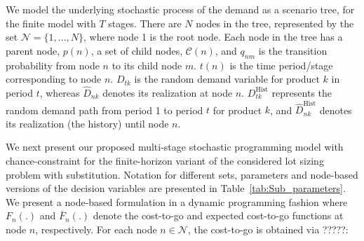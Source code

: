 \documentclass[10pt]{article}
\newcommand{\ti}{t} %
\newcommand{\Ti}{T}
\newcommand{\ka}{k} %
\newcommand{\InvPos}{inventory level after production }
\newcommand{\cn}{\mathcal{C}(n) }
\begin{document}
We model the underlying stochastic process of the demand as a scenario tree, for the finite model with $\Ti$ stages. There are $N$ nodes in the tree, represented by the set $\mathcal{N} = \{1, ..., N\}$, where node 1 is the root node. 
 Each node in the tree has a parent node, $p(n)$, a set of child nodes, $\cn$, and $q_{nm}$ is the transition probability from node $n$ to its child node $m$. $\ti(n)$ is the time period/stage corresponding to node $n$. 
$D_{\ti \ka}$ is the random demand variable for product $\ka$ in period $\ti$, whereas $\hat{D}_{n \ka}$ denotes its realization at node $n$.
$D^\text{Hist}_{\ti \ka}$ represents the random demand path from period 1 to period $\ti$ for product $\ka$, and $\hat{D}^\text{Hist}_{n\ka}$ denotes its realization (the history) until node $n$.


We next present our proposed multi-stage stochastic programming model with chance-constraint for the finite-horizon variant of the considered lot sizing problem with substitution.
Notation for different sets, parameters and node-based versions of the decision variables are presented in Table~\ref{tab:Sub_parameters}. 
We present a node-based formulation in a dynamic programming fashion where $F_n(.)$ and $\overline{F}_n(.)$ denote the cost-to-go and expected cost-to-go functions at node $n$, respectively. 
 For each node $n \in \mathcal{N}$, the cost-to-go is obtained via ?????:
\end{document}

